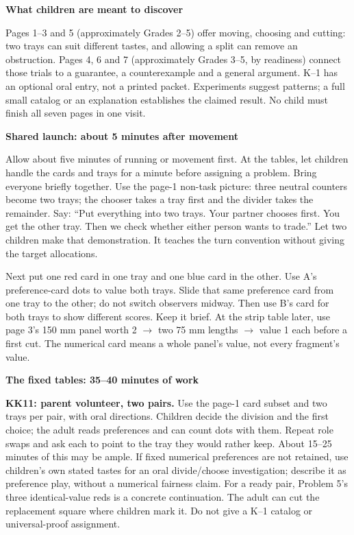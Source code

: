 \documentclass[11pt]{article}
\newcommand{\heading}[1]{\par\vspace{1.5mm}{\large\bfseries #1}\par\vspace{.8mm}}
\newcommand{\subhead}[1]{\par\vspace{1mm}\textbf{#1}\par}
\newcommand{\page}[1]{\newpage\heading{#1}}
\begin{document}
\subhead{What children are meant to discover}
Pages 1--3 and 5 (approximately Grades 2--5) offer moving, choosing and cutting: two trays can suit different tastes, and allowing a split can remove an obstruction. Pages 4, 6 and 7 (approximately Grades 3--5, by readiness) connect those trials to a guarantee, a counterexample and a general argument. K--1 has an optional oral entry, not a printed packet. Experiments suggest patterns; a full small catalog or an explanation establishes the claimed result. No child must finish all seven pages in one visit.

\page{Running the hour with three anchored adults}
\subhead{Shared launch: about 5 minutes after movement}
Allow about five minutes of running or movement first. At the tables, let children handle the cards and trays for a minute before assigning a problem. Bring everyone briefly together. Use the page-1 non-task picture: three neutral counters become two trays; the chooser takes a tray first and the divider takes the remainder. Say: ``Put everything into two trays. Your partner chooses first. You get the other tray. Then we check whether either person wants to trade.'' Let two children make that demonstration. It teaches the turn convention without giving the target allocations.

Next put one red card in one tray and one blue card in the other. Use A's preference-card dots to value both trays. Slide that same preference card from one tray to the other; do not switch observers midway. Then use B's card for both trays to show different scores. Keep it brief. At the strip table later, use page 3's 150 mm panel worth 2 $\to$ two 75 mm lengths $\to$ value 1 each before a first cut. The numerical card means a whole panel's value, not every fragment's value.

\subhead{The fixed tables: 35--40 minutes of work}
\textbf{KK11: parent volunteer, two pairs.} Use the page-1 card subset and two trays per pair, with oral directions. Children decide the division and the first choice; the adult reads preferences and can count dots with them. Repeat role swaps and ask each to point to the tray they would rather keep. About 15--25 minutes of this may be ample. If fixed numerical preferences are not retained, use children's own stated tastes for an oral divide/choose investigation; describe it as preference play, without a numerical fairness claim. For a ready pair, Problem 5's three identical-value reds is a concrete continuation. The adult can cut the replacement square where children mark it. Do not give a K--1 catalog or universal-proof assignment.
\end{document}
